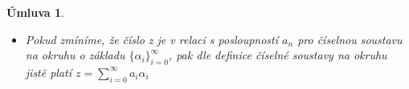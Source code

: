 \documentclass[12pt]{book}
\newtheorem*{umluva}{Úmluva}
\begin{document}
\begin{umluva}
\begin{itemize}
		\item Pokud zmíníme, že číslo z je v relaci s posloupností $a_n$ pro číselnou soustavu na okruhu o základu $\{\alpha_i\}_{i=0}^\infty$, pak dle definice číselné soustavy na okruhu jistě platí $z = \sum_{i=0}^{\infty} a_{i}\alpha_{i}$
	\end{itemize}
\end{umluva}

\newpage
\end{document}

